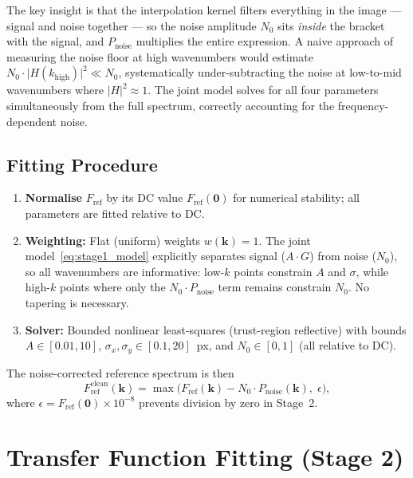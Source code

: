 \documentclass[11pt,a4paper]{article}
\newcommand{\kv}{\mathbf{k}}
\newcommand{\Fref}{F_\mathrm{ref}}
\newcommand{\Fclean}{F_\mathrm{ref}^\mathrm{clean}}
\newcommand{\Pnoise}{P_\mathrm{noise}}
\begin{document}
The key insight is that the interpolation kernel filters everything in the image --- signal and noise together --- so the noise amplitude $N_0$ sits \emph{inside} the bracket with the signal, and $\Pnoise$ multiplies the entire expression.
A naive approach of measuring the noise floor at high wavenumbers would estimate $N_0 \cdot \lvert H(k_\mathrm{high})\rvert^2 \ll N_0$, systematically under-subtracting the noise at low-to-mid wavenumbers where $\lvert H\rvert^2 \approx 1$.
The joint model solves for all four parameters simultaneously from the full spectrum, correctly accounting for the frequency-dependent noise.

\subsection{Fitting Procedure}

\begin{enumerate}[leftmargin=2em]
    \item \textbf{Normalise} $\Fref$ by its DC value $\Fref(\mathbf{0})$ for numerical stability; all parameters are fitted relative to DC.

    \item \textbf{Weighting:} Flat (uniform) weights $w(\kv) = 1$.
    The joint model~\eqref{eq:stage1_model} explicitly separates signal ($A \cdot G$) from noise ($N_0$), so all wavenumbers are informative: low-$k$ points constrain $A$ and $\sigma$, while high-$k$ points where only the $N_0 \cdot \Pnoise$ term remains constrain $N_0$.
    No tapering is necessary.

    \item \textbf{Solver:} Bounded nonlinear least-squares (trust-region reflective) with bounds $A \in [0.01, 10]$, $\sigma_x, \sigma_y \in [0.1, 20]$~px, and $N_0 \in [0, 1]$ (all relative to DC).
\end{enumerate}

The noise-corrected reference spectrum is then
%
\begin{equation}
    \Fclean(\kv) = \max\!\bigl(\Fref(\kv) - N_0 \cdot \Pnoise(\kv),\; \epsilon\bigr),
    \label{eq:fref_clean}
\end{equation}
%
where $\epsilon = \Fref(\mathbf{0}) \times 10^{-8}$ prevents division by zero in Stage~2.

\section{Transfer Function Fitting (Stage 2)}
\label{sec:stage2}
\end{document}
